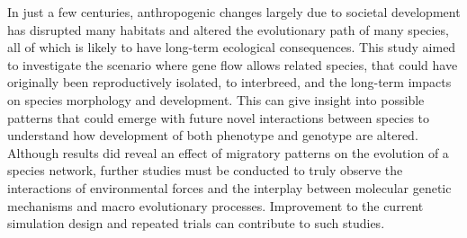 In just a few centuries, anthropogenic changes largely due to societal development has disrupted many habitats and altered the evolutionary path of many species, all of which is likely to have long-term ecological consequences. This study aimed to investigate the scenario where gene flow allows related species, that could have originally been reproductively isolated, to interbreed, and the long-term impacts on species morphology and development. This can give insight into possible patterns that could emerge with future novel interactions between species to understand how development of both phenotype and genotype are altered. Although results did reveal an effect of migratory patterns on the evolution of a species network, further studies must be conducted to truly observe the interactions of environmental forces and the interplay between molecular genetic mechanisms and macro evolutionary processes. Improvement to the current simulation design and repeated trials can contribute to such studies.
